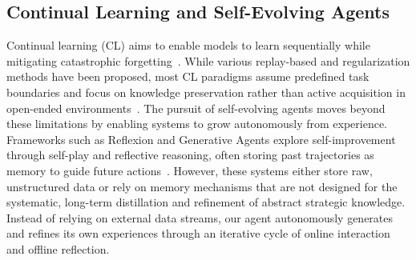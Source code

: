 \subsection{Continual Learning and Self-Evolving Agents}
Continual learning (CL) aims to enable models to learn sequentially while mitigating catastrophic forgetting~\citep{parisi2019continual,wang2024comprehensivesurveycontinuallearning}. While various replay-based and regularization methods have been proposed, most CL paradigms assume predefined task boundaries and focus on knowledge preservation rather than active acquisition in open-ended environments~\citep{Kirkpatrick_2017,ding2024boostinglargelanguagemodels,huai2025taskcorememorymanagementconsolidation,huai2025clmoeenhancingmultimodallarge}. The pursuit of self-evolving agents moves beyond these limitations by enabling systems to grow autonomously from experience. Frameworks such as Reflexion and Generative Agents explore self-improvement through self-play and reflective reasoning, often storing past trajectories as memory to guide future actions~\citep{shinn2023reflexionlanguageagentsverbal,wei2022chain,yao2023tree,besta2024graph,yao2023reactsynergizingreasoningacting}. However, these systems either store raw, unstructured data or rely on memory mechanisms that are not designed for the systematic, long-term distillation and refinement of abstract strategic knowledge. 
Instead of relying on external data streams, our agent autonomously generates and refines its own experiences through an iterative cycle of online interaction and offline reflection.


